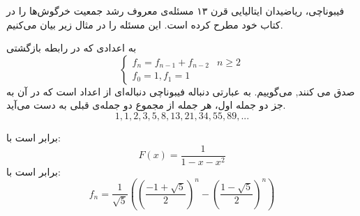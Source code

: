 \p
فیبوناچی، ریاضیدان ایتالیایی قرن ۱۳ ‌مسئله‌ی معروف رشد جمعیت خرگوش‌ها را در کتاب خود مطرح کرده است.
این مسئله را در مثال زیر بیان می‌کنیم.



    
\begin{DEFINITION}
    به اعدادی که در رابطه بازگشتی
  \[\begin{cases}
      f_{n}=f_{n-1} + f_{n-2} & n\geq 2 \\
      
      f_0=1 ,
      f_1 = 1
  \end{cases}
  \]
  صدق می کنند,
    می‌گوییم.
    به عبارتی دنباله فیبوناچی
    دنباله‌ای از اعداد است که در آن به جز دو جمله اول، هر جمله از مجموع دو جمله‌ی قبلی به دست می‌آید.
    \p
  $$1, 1, 2, 3, 5, 8, 13, 21, 34, 55, 89, ...$$
\end{DEFINITION}




\begin{THEOREM}
    \p
    برابر است با:
    $$F(x) = \frac{1}{1 - x - x^2}$$
    برابر است با:
    $$f_n = \frac{1}{\sqrt{5}}((\frac{-1 + \sqrt{5}}{2})^{n} - (\frac{1 - \sqrt{5}}{2})^{n})$$
\end{THEOREM}



